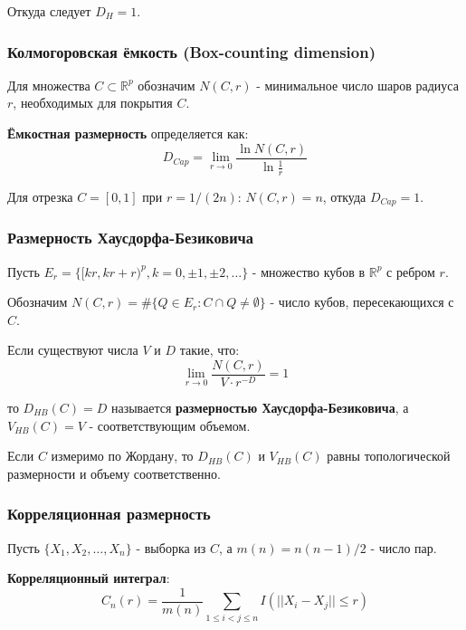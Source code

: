\documentclass[a4paper,12pt]{article}
\begin{document}
Откуда следует $D_H = 1$.

\subsubsection{Колмогоровская ёмкость (Box-counting dimension)}

Для множества $C \subset \mathbb{R}^p$ обозначим $N(C, r)$ - минимальное число шаров радиуса $r$, необходимых для покрытия $C$.

\textbf{Ёмкостная размерность} определяется как:
\begin{equation}
    D_{Cap} = \lim_{r \to 0} \frac{\ln N(C, r)}{\ln \frac{1}{r}}
\end{equation}

Для отрезка $C = [0, 1]$ при $r = 1/(2n)$: $N(C, r) = n$, откуда $D_{Cap} = 1$.

\subsubsection{Размерность Хаусдорфа-Безиковича}

Пусть $E_r = \{[kr, kr + r)^p, k = 0, \pm 1, \pm 2, \ldots\}$ - множество кубов в $\mathbb{R}^p$ с ребром $r$.

Обозначим $N(C, r) = \#\{Q \in E_r: C \cap Q \neq \emptyset\}$ - число кубов, пересекающихся с $C$.

Если существуют числа $V$ и $D$ такие, что:
\begin{equation}
    \lim_{r \to 0} \frac{N(C, r)}{V \cdot r^{-D}} = 1
\end{equation}

то $D_{HB}(C) = D$ называется \textbf{размерностью Хаусдорфа-Безиковича}, а $V_{HB}(C) = V$ - соответствующим объемом.

Если $C$ измеримо по Жордану, то $D_{HB}(C)$ и $V_{HB}(C)$ равны топологической размерности и объему соответственно.

\subsubsection{Корреляционная размерность}

Пусть $\{X_1, X_2, \ldots, X_n\}$ - выборка из $C$, а $m(n) = n(n-1)/2$ - число пар.

\textbf{Корреляционный интеграл}:
\begin{equation}
    C_n(r) = \frac{1}{m(n)} \sum_{1 \leq i < j \leq n} I(||X_i - X_j|| \leq r)
\end{equation}
\end{document}

